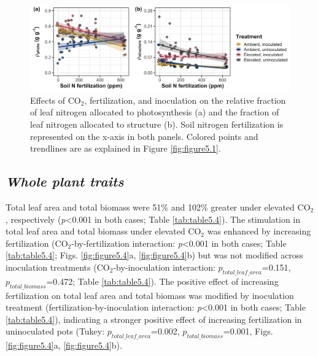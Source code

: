 \newpage
\begin{landscape}
    \begin{figure}
        \centering
        \includegraphics[width=\columnwidth]{ch5_NxCO2xI/figs/NxCO2xI_fig3_propN.jpg}
        \caption[Effects of CO$_2$, fertilization, and inoculation on the relative fraction of leaf nitrogen allocated to photosynthesis and the fraction of leaf nitrogen allocated to structure]{Effects of CO$_2$, fertilization, and inoculation on the relative fraction of leaf nitrogen allocated to photosynthesis (a) and the fraction of leaf nitrogen allocated to structure (b). Soil nitrogen fertilization is represented on the x-axis in both panels. Colored points and trendlines are as explained in Figure \ref{fig:figure5.1}.}
        \label{fig:figure5.3}
    \end{figure}
\end{landscape}
\clearpage

\subsection{\textit{Whole plant traits}}
\noindent Total leaf area and total biomass were 51\% and 102\% greater under elevated CO$_2$, respectively (\textit{p}<0.001 in both cases; Table \ref{tab:table5.4}). The stimulation in total leaf area and total biomass under elevated CO$_2$ was enhanced by increasing fertilization (CO$_2$-by-fertilization interaction: \textit{p}<0.001 in both cases; Table \ref{tab:table5.4}; Figs. \ref{fig:figure5.4}a, \ref{fig:figure5.4}b) but was not modified across inoculation treatments (CO$_2$-by-inoculation interaction: $p_{total\_leaf\_area}$=0.151, $p_{total\_biomass}$=0.472; Table \ref{tab:table5.4}). The positive effect of increasing fertilization on total leaf area and total biomass was modified by inoculation treatment (fertilization-by-inoculation interaction: \textit{p}<0.001 in both cases; Table \ref{tab:table5.4}), indicating a stronger positive effect of increasing fertilization in uninoculated pots (Tukey: $p_{total\_leaf\_area}$=0.002, $p_{total\_biomass}$=0.001, Figs. \ref{fig:figure5.4}a, \ref{fig:figure5.4}b).


